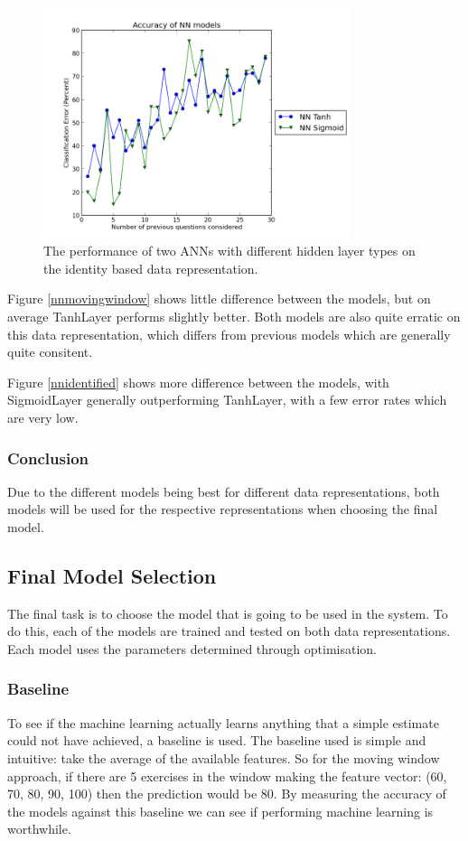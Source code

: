 \begin{figure}[h!]
\centering
\includegraphics[width=0.8\textwidth]{images/nnidentified.png}
\caption{The performance of two ANNs with different hidden layer types on the identity based data representation.}
\label{fig:nnidentified}
\end{figure}

Figure \ref{nnmovingwindow}	shows little difference between the models, but on average TanhLayer performs slightly better. Both models are also quite erratic on this data representation, which differs from previous models which are generally quite consitent.

Figure \ref{nnidentified} shows more difference between the models, with SigmoidLayer generally outperforming TanhLayer, with a few error rates which are very low.

\subsubsection{Conclusion}
Due to the different models being best for different data representations, both models will be used for the respective representations when choosing the final model.

\subsection{Final Model Selection}
The final task is to choose the model that is going to be used in the system. To do this, each of the models are trained and tested on both data representations. Each model uses the parameters determined through optimisation.

\subsubsection{Baseline}
To see if the machine learning actually learns anything that a simple estimate could not have achieved, a baseline is used. The baseline used is simple and intuitive: take the average of the available features. So for the moving window approach, if there are 5 exercises in the window making the feature vector: (60, 70, 80, 90, 100) then the prediction would be 80. By measuring the accuracy of the models against this baseline we can see if performing machine learning is worthwhile.

